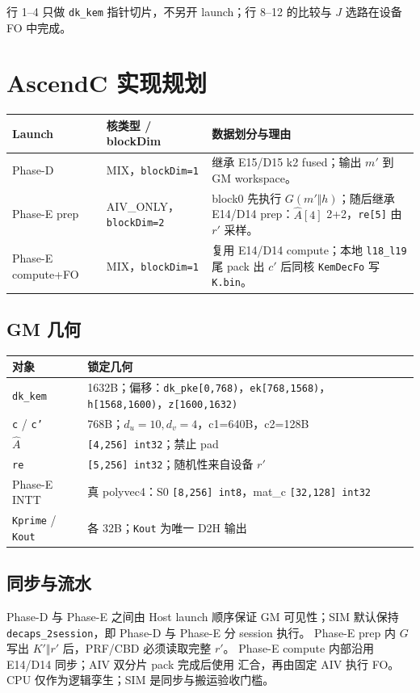 \documentclass[UTF8,a4paper,11pt]{ctexart}
\newcommand{\apiname}[1]{\texttt{\seqsplit{#1}}}
\begin{document}
行 1--4 只做 \texttt{dk\_kem} 指针切片，不另开 launch；行 8--12 的比较与 $J$ 选路在设备 FO 中完成。

\section{AscendC 实现规划}

\begin{longtable}{@{}L{2.8cm}L{3.1cm}L{7.2cm}@{}}
\toprule
Launch & 核类型 / blockDim & 数据划分与理由 \\
\midrule
Phase-D & MIX，\texttt{blockDim=1} & 继承 E15/D15 k2 fused；输出 $m'$ 到 GM workspace。 \\
Phase-E prep & AIV\_ONLY，\texttt{blockDim=2} & block0 先执行 $G(m'\Vert h)$；随后继承 E14/D14 prep：$\hat A[4]$ 2+2，\texttt{re[5]} 由 $r'$ 采样。 \\
Phase-E compute+FO & MIX，\texttt{blockDim=1} & 复用 E14/D14 compute；本地 \texttt{l18\_l19} 尾 pack 出 $c'$ 后同核 \texttt{KemDecFo} 写 \texttt{K.bin}。 \\
\bottomrule
\end{longtable}

\subsection{GM 几何}
\begin{longtable}{@{}L{3.8cm}L{9.3cm}@{}}
\toprule
对象 & 锁定几何 \\
\midrule
\texttt{dk\_kem} & 1632B；偏移：\texttt{dk\_pke[0,768)}，\texttt{ek[768,1568)}，\texttt{h[1568,1600)}，\texttt{z[1600,1632)} \\
\texttt{c} / \texttt{c'} & 768B；$d_u=10,d_v=4$，c1=640B，c2=128B \\
$\hat A$ & \texttt{[4,256] int32}；禁止 pad \\
\texttt{re} & \texttt{[5,256] int32}；随机性来自设备 $r'$ \\
Phase-E INTT & 真 polyvec4：S0 \texttt{[8,256] int8}，mat\_c \texttt{[32,128] int32} \\
\texttt{Kprime} / \texttt{Kout} & 各 32B；\texttt{Kout} 为唯一 D2H 输出 \\
\bottomrule
\end{longtable}

\subsection{同步与流水}
Phase-D 与 Phase-E 之间由 Host launch 顺序保证 GM 可见性；SIM 默认保持 \texttt{decaps\_2session}，即 Phase-D 与 Phase-E 分 session 执行。
Phase-E prep 内 $G$ 写出 $K'\Vert r'$ 后，PRF/CBD 必须读取完整 $r'$。
Phase-E compute 内部沿用 E14/D14 同步；AIV 双分片 pack 完成后使用 \apiname{SyncAll} 汇合，再由固定 AIV 执行 FO。
CPU 仅作为逻辑孪生；SIM 是同步与搬运验收门槛。
\end{document}
